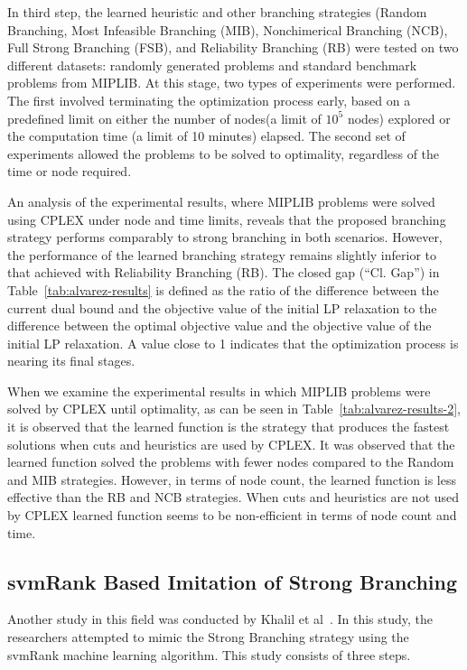 In third step, the learned heuristic and other branching strategies (Random Branching, Most Infeasible Branching (MIB), Nonchimerical Branching (NCB), Full Strong Branching (FSB), and Reliability Branching (RB) were tested on two different datasets: randomly generated problems and standard benchmark problems from MIPLIB.
At this stage, two types of experiments were performed.
The first involved terminating the optimization process early, based on a predefined limit on either the number of nodes(a limit of $10^5$ nodes) explored or the computation time (a limit of 10 minutes) elapsed.
The second set of experiments allowed the problems to be solved to optimality, regardless of the time or node required.


An analysis of the experimental results, where MIPLIB problems were solved using CPLEX under node and time limits, reveals that the proposed branching strategy performs comparably to strong branching in both scenarios.
However, the performance of the learned branching strategy remains slightly inferior to that achieved with Reliability Branching (RB).
The closed gap (“Cl. Gap”) in Table~\ref{tab:alvarez-results} is defined as the ratio of the difference between the current dual bound and the objective value of the initial LP relaxation to the difference between the optimal objective value and the objective value of the initial LP relaxation.
A value close to 1 indicates that the optimization process is nearing its final stages.




When we examine the experimental results in which MIPLIB problems were solved by CPLEX until optimality, as can be seen in Table~\ref{tab:alvarez-results-2}, it is observed that the learned function is the strategy that produces the fastest solutions when cuts and heuristics are used by CPLEX.
It was observed that the learned function solved the problems with fewer nodes compared to the Random and MIB strategies.
However, in terms of node count, the learned function is less effective than the RB and NCB strategies.
When cuts and heuristics are not used by CPLEX learned function seems to be non-efficient in terms of node count and time.



\subsection{svmRank Based Imitation of Strong Branching}
Another study in this field was conducted by Khalil et al~\cite{khalilLearningBranchMixed2016}.
In this study, the researchers attempted to mimic the Strong Branching strategy using the svmRank machine learning algorithm.
This study consists of three steps.


